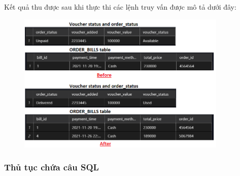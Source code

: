 \documentclass[13pt,a4paper]{article}
\begin{document}
	Kết quả thu được sau khi thực thi các lệnh truy vấn được mô tả dưới đây:
	\begin{figure}[h!]
		\begin{center}
			\includegraphics[width=10cm]{vitran/trigger_od.png}
		\end{center}
	\end{figure}
	\newpage
	\subsubsection{Thủ tục chứa câu SQL}
\end{document}

